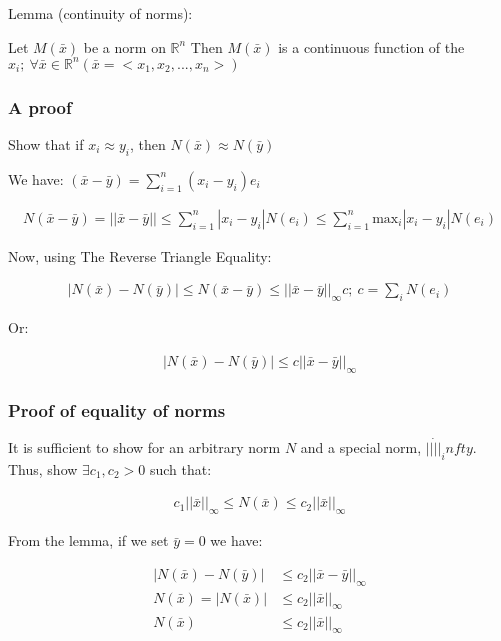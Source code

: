Lemma (continuity of norms):

Let $M(\bar{x})$ be a norm on $\mathbb{R}^n$ Then $M(\bar{x})$ is a continuous function of the $x_i;\ \forall \bar{x} \in \mathbb{R}^n (\bar{x} = <x_1, x_2, ..., x_n>)$

\subsubsection{A proof}

Show that if $x_i \approx y_i$, then $N(\bar{x}) \approx N(\bar{y})$

We have: $(\bar{x} - \bar{y}) = \sum_{i=1}^{n} (x_i - y_i) e_i$

\begin{align*}
  N(\bar{x} - \bar{y}) = ||\bar{x} - \bar{y}|| \leq \sum_{i=1}^{n} |x_i - y_i| N(e_i) \leq \sum_{i=1}^{n} \text{max}_i |x_i - y_i| N(e_i)
\end{align*}

Now, using The Reverse Triangle Equality:

\begin{align*}
  |N(\bar{x}) - N(\bar{y})| \leq N(\bar{x} - \bar{y}) \leq ||\bar{x} - \bar{y}||_\infty c;\ c = \sum_i N(e_i)
\end{align*}

Or:

\begin{align*}
  |N(\bar{x}) - N(\bar{y})| \leq c ||\bar{x} - \bar{y}||_\infty
\end{align*}

\subsubsection{Proof of equality of norms}

It is sufficient to show for an arbitrary norm $N$ and a special norm, $||\dot||_infty$. Thus, show $\exists c_1, c_2 > 0$ such that:

\begin{align*}
  c_1 ||\bar{x}||_\infty \leq N(\bar{x}) \leq c_2 ||\bar{x}||_\infty
\end{align*}

From the lemma, if we set $\bar{y} = 0$ we have:

\begin{align*}
  |N(\bar{x}) - N(\bar{y})|  & \leq c_2 ||\bar{x} - \bar{y}||_\infty \\
  N(\bar{x}) = |N(\bar{x})| & \leq c_2 ||\bar{x}||_\infty \\
  N(\bar{x})                & \leq c_2 ||\bar{x}||_\infty
\end{align*}

